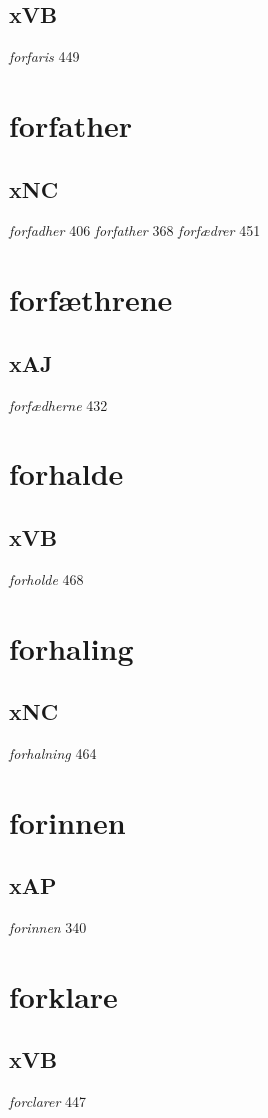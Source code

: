 \documentclass[a4paper,twocolumn]{article}
\begin{document}
\subsection{xVB}
\label{sec:org017be50}
\emph{forfaris} 449 
\section{forfather}
\label{sec:org6b3618e}
\subsection{xNC}
\label{sec:orgf93ba81}
\emph{forfadher} 406 \emph{forfather} 368 \emph{forfædrer} 451 
\section{forfæthrene}
\label{sec:org7cfbf86}
\subsection{xAJ}
\label{sec:org83b81a7}
\emph{forfædherne} 432 
\section{forhalde}
\label{sec:orgc6eb7f0}
\subsection{xVB}
\label{sec:org161a8fc}
\emph{forholde} 468 
\section{forhaling}
\label{sec:org9ede1fb}
\subsection{xNC}
\label{sec:org2b4fbe0}
\emph{forhalning} 464 
\section{forinnen}
\label{sec:org45de13a}
\subsection{xAP}
\label{sec:orgac77bba}
\emph{forinnen} 340 
\section{forklare}
\label{sec:orgf8ec27e}
\subsection{xVB}
\label{sec:orgbb17557}
\emph{forclarer} 447 
\end{document}
